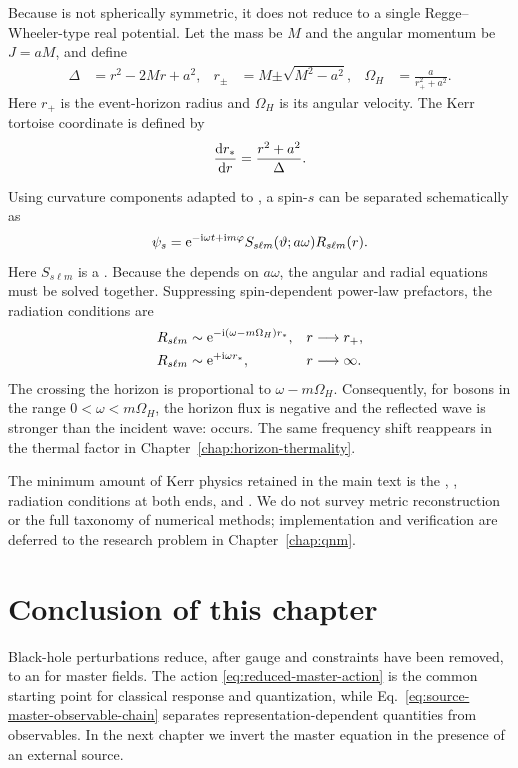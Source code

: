 Because  is not spherically symmetric, it does not reduce to a single Regge--Wheeler-type real potential. Let the mass be $M$ and the angular momentum be $J=aM$, and define
\begin{align}
\Delta
&=
r^2-2Mr+a^2,
&
r_\pm
&=
M\mathord{\pm}\sqrt{M^2-a^2},
&
\Omega_H
&=
\frac{a}{r_+^2+a^2}.
\label{eq:kerr-horizon-minimum}
\end{align}
Here $r_+$ is the event-horizon radius and $\Omega_H$ is its angular velocity. The Kerr tortoise coordinate is defined by
\begin{equation}
\frac{\mathrm{d}r_*}{\mathrm{d} r}
=
\frac{r^2+a^2}{\Delta}.
\label{eq:kerr-tortoise-minimum}
\end{equation}

Using curvature components adapted to , a spin-$s$  can be separated schematically as
\begin{equation}
\psi_s
=
\mathrm{e}^{-\mathrm{i}\omega t+\mathrm{i} m\varphi}
S_{s\ell m}(\vartheta;a\omega)
R_{s\ell m}(r).
\label{eq:teukolsky-separation-minimum}
\end{equation}
\cite{Teukolsky:1972my} Here $S_{s\ell m}$ is a . Because the  depends on $a\omega$, the angular and radial equations must be solved together. Suppressing spin-dependent power-law prefactors, the radiation conditions are
\begin{align}
R_{s\ell m}
&\sim
\mathrm{e}^{-\mathrm{i}(\omega-m\Omega_H)r_*},
&&r\longrightarrow r_+,
\label{eq:kerr-horizon-bc-minimum}
\\
R_{s\ell m}
&\sim
\mathrm{e}^{+\mathrm{i}\omega r_*},
&&r\longrightarrow\infty.
\label{eq:kerr-infinity-bc-minimum}
\end{align}
The  crossing the horizon is proportional to $\omega-m\Omega_H$. Consequently, for bosons in the range $0<\omega<m\Omega_H$, the horizon flux is negative and the reflected wave is stronger than the incident wave:  occurs. The same frequency shift reappears in the thermal factor in Chapter~\ref{chap:horizon-thermality}.

The minimum amount of Kerr physics retained in the main text is the , , radiation conditions at both ends, and . We do not survey metric reconstruction or the full taxonomy of numerical methods; implementation and verification are deferred to the research problem in Chapter~\ref{chap:qnm}.

\section{Conclusion of this chapter}

Black-hole perturbations reduce, after gauge and constraints have been removed, to an  for master fields. The action \eqref{eq:reduced-master-action} is the common starting point for classical response and quantization, while Eq.~\eqref{eq:source-master-observable-chain} separates representation-dependent quantities from observables. In the next chapter we invert the master equation in the presence of an external source.

